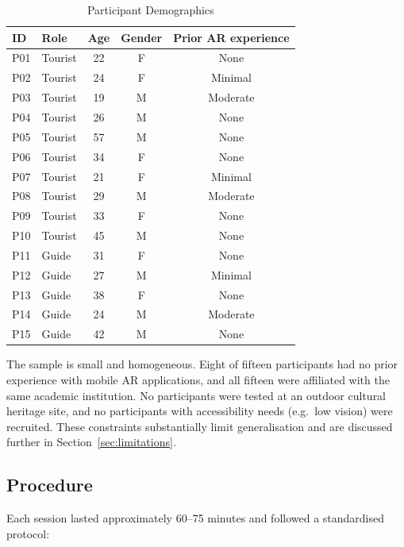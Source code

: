 \begin{table}[htbp]
  \centering
  \caption{Participant Demographics}
  \label{tab:participants}
  \begin{tabular}{llccc}
    \toprule
    \textbf{ID} & \textbf{Role} & \textbf{Age} & \textbf{Gender} &
    \textbf{Prior AR experience} \\
    \midrule
    P01 & Tourist & 22 & F & None \\
    P02 & Tourist & 24 & F & Minimal \\
    P03 & Tourist & 19 & M & Moderate \\
    P04 & Tourist & 26 & M & None \\
    P05 & Tourist & 57 & M & None \\
    P06 & Tourist & 34 & F & None \\
    P07 & Tourist & 21 & F & Minimal \\
    P08 & Tourist & 29 & M & Moderate \\
    P09 & Tourist & 33 & F & None \\
    P10 & Tourist & 45 & M & None \\
    P11 & Guide   & 31 & F & None \\
    P12 & Guide   & 27 & M & Minimal \\
    P13 & Guide   & 38 & F & None \\
    P14 & Guide   & 24 & M & Moderate \\
    P15 & Guide   & 42 & M & None \\
    \bottomrule
  \end{tabular}
\end{table}

The sample is small and homogeneous. Eight of fifteen participants had no prior
experience with mobile AR applications, and all fifteen were affiliated with the same
academic institution. No participants were tested at an outdoor cultural heritage site,
and no participants with accessibility needs (e.g.\ low vision) were recruited.
These constraints substantially limit generalisation and are discussed further in
Section~\ref{sec:limitations}.

\subsection{Procedure}
\label{sec:procedure}

Each session lasted approximately 60--75 minutes and followed a standardised protocol:

